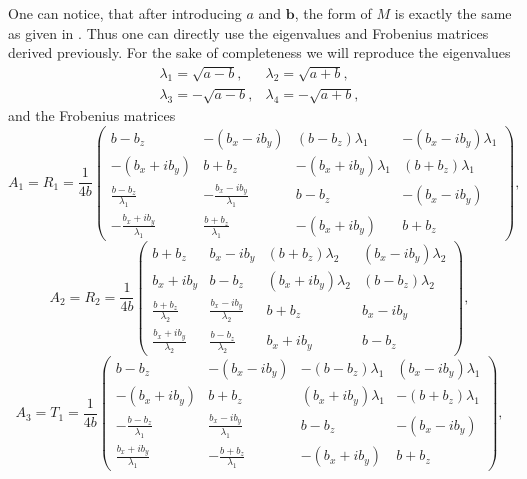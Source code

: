 \documentclass[12pt,a4paper]{article}
\begin{document}
One can notice, that after introducing $a$ and $\boldsymbol{b}$, the form of $M$ is exactly the same as given in \cite{walter}. Thus one can directly use the eigenvalues and Frobenius matrices derived previously. For the sake of completeness we will reproduce the eigenvalues
\begin{equation}
\begin{matrix}
\lambda_{1} = \sqrt{a - b}, & \lambda_{2} = \sqrt{a + b}, \\
\lambda_{3} = -\sqrt{a - b}, & \lambda_{4} = -\sqrt{a + b},
\end{matrix}
\end{equation}
and the Frobenius matrices
\begin{equation*}
A_1 = R_1
= \frac{1}{4 b}
\left(
\begin{matrix}
    b - b_z	&	-(b_x - i b_y)	&	(b - b_z) \lambda_1	&	-(b_x - i b_y) \lambda_1 \\
    -(b_x + i b_y)	&	b + b_z	&	-(b_x + i b_y) \lambda_1	&	(b + b_z) \lambda_1 \\
	\frac{b - b_z}{\lambda_1}	&	-\frac{b_x - i b_y}{\lambda_1}	&	b - b_z	&	-(b_x - i b_y) \\
	-\frac{b_x + i b_y}{\lambda_1}	&	\frac{b + b_z}{\lambda_1}	&	-(b_x + i b_y)	&	b + b_z
\end{matrix}
\right),
\end{equation*}
\begin{equation*}
A_2 = R_2
= \frac{1}{4 b}
\left(
\begin{matrix}
    b + b_z	&	b_x - i b_y	&	(b + b_z) \lambda_2	&	(b_x - i b_y) \lambda_2 \\
    b_x + i b_y	&	b - b_z	&	(b_x + i b_y) \lambda_2	&	(b - b_z) \lambda_2 \\
	\frac{b + b_z}{\lambda_2}	&	\frac{b_x - i b_y}{\lambda_2}	&	b + b_z	&	b_x - i b_y \\
	\frac{b_x + i b_y}{\lambda_2}	&	\frac{b - b_z}{\lambda_2}	&	b_x + i b_y	&	b - b_z
\end{matrix}
\right),
\end{equation*}
\begin{equation*}
A_3 = T_1
= \frac{1}{4 b}
\left(
\begin{matrix}
    b - b_z	&	-(b_x - i b_y)	&	-(b - b_z) \lambda_1	&	(b_x - i b_y) \lambda_1 \\
    -(b_x + i b_y)	&	b + b_z	&	(b_x + i b_y) \lambda_1	&	-(b + b_z) \lambda_1 \\
	-\frac{b - b_z}{\lambda_1}	&	\frac{b_x - i b_y}{\lambda_1}	&	b - b_z	&	-(b_x - i b_y) \\
	\frac{b_x + i b_y}{\lambda_1}	&	-\frac{b + b_z}{\lambda_1}	&	-(b_x + i b_y)	&	b + b_z
\end{matrix}
\right),
\end{equation*}
\end{document}

